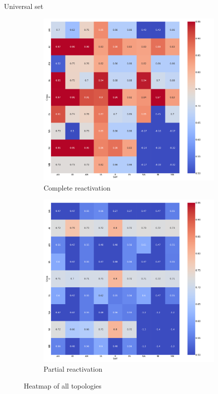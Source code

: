 \documentclass[aspectratio=169,9pt]{beamer}
\begin{document}
    \begin{frame}{Universal set}
        \begin{figure}[h]
            \centering
            \begin{subfigure}[b]{0.49\textwidth}
                \centering
                \includegraphics[width=\textwidth]{vary_all-iPSC_timeshifted-rsq-hmap}
                \caption{Complete reactivation}
            \end{subfigure}
            \begin{subfigure}[b]{0.49\textwidth}
                \centering
                \includegraphics[width=\textwidth]{vary_all-Partial_timeshifted-rsq-hmap}
                \caption{Partial reactivation}
            \end{subfigure}
            \caption{Heatmap of all topologies}
        \end{figure}
    \end{frame}
\end{document}
